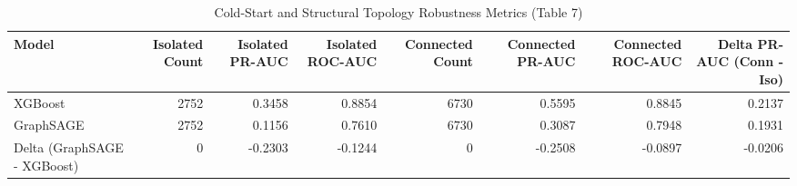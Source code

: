\begin{table}
\caption{Cold-Start and Structural Topology Robustness Metrics (Table 7)}
\label{tab:coldstart_metrics}
\begin{tabular}{lrrrrrrr}
\toprule
Model & Isolated Count & Isolated PR-AUC & Isolated ROC-AUC & Connected Count & Connected PR-AUC & Connected ROC-AUC & Delta PR-AUC (Conn - Iso) \\
\midrule
XGBoost & 2752 & 0.3458 & 0.8854 & 6730 & 0.5595 & 0.8845 & 0.2137 \\
GraphSAGE & 2752 & 0.1156 & 0.7610 & 6730 & 0.3087 & 0.7948 & 0.1931 \\
Delta (GraphSAGE - XGBoost) & 0 & -0.2303 & -0.1244 & 0 & -0.2508 & -0.0897 & -0.0206 \\
\bottomrule
\end{tabular}
\end{table}
